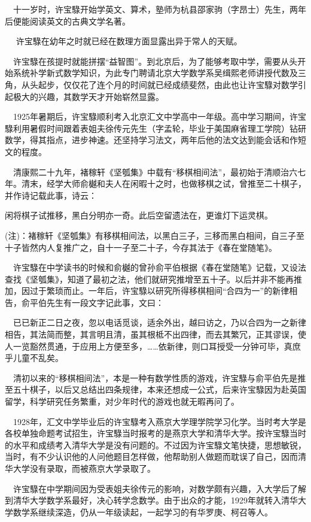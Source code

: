 \begin{frame}
	$\quad$十一岁时，许宝騄开始学英文、算术，塾师为杭县邵家驹（字昂士）先生，两年后便能阅读英文的古典文学名著。
	
	$\quad$	许宝騄在幼年之时就已经在数理方面显露出异于常人的天赋。
	
	$\quad$许宝騄在孩提时就能拼摆“益智图”。到北京后，为了能够考取中学，需要从头开始系统补学新式数学知识，为此专门聘请北京大学数学系吴缉熙老师讲授代数及三角，从头起步，仅仅花了连个月的时间就已经成绩斐然，由此也让许宝騄对数学引起极大的兴趣，其数学天才开始崭然显露。
	
	$\quad$1925年暑期后，许宝騄顺利考入北京汇文中学高中一年级。高中学习期间，许宝騄利用暑假时间跟着表姐夫徐传元先生（字孟轮，毕业于美国麻省理工学院）钻研数学，得其指点，进步神速。还坚持学习法文，两年后他的法文达到能会话和作短文的程度。
	
\end{frame}

\begin{frame}
	$\quad$清康熙二十九年，褚稼轩《坚瓠集》中载有“移棋相间法”，最初始于清顺治六七年。清末，经学大师俞樾和夫人在闲暇十之时，也做移棋之试，曾推至二十棋子，并作诗记载此事，诗云：
	
	闲将棋子试推移，黑白分明亦一奇。此后空留遗法在，更谁灯下运灵棋。
	
	(注)：褚稼轩《坚瓠集》有移棋相间法，以黑白三子，三移而黑白相间，自三子至十子皆然内人复推广之，自十一子至二十子，今存其法于《春在堂随笔》。
	
	$\quad$许宝騄在中学读书的时候和俞樾的曾孙俞平伯根据《春在堂随笔》记载，又设法查找《坚瓠集》，知道了最初之法，他们就研究推增至五十子。以后并非不能再推加，因过于繁琐而止。一年后，许宝騄以研究所得移棋相间“合四为一”的新律相告，俞平伯先生有一段文字记此事，文曰：
	
	$\quad$已已新正二日之夜，忽以电话觅谈，适余外出，越曰访之，乃以合四为一之新律相告，其法简而整，其言明且清，虽其根柢不出四律，而去其繁冗，正其谬误，使人一览豁然贯通，于应用上方便至多，……依新律，则口耳授受一分钟可毕，真庶乎儿童不乱矣。
	
\end{frame}

\begin{frame}
	$\quad$清初以来的“移棋相间法”，本是一种有数学性质的游戏，许宝騄与俞平伯先是推至五十棋子，以后又总结出四条规律，本来还想成一公式，后来许宝騄因为赴英国留学，科学研究任务繁重，对少年时代的游戏也就无暇再问了。
	
	$\quad$1928年，汇文中学毕业后的许宝騄考入燕京大学理学院学习化学。当时考大学是各校单独命题考试招生，许宝騄当时报考的是燕京大学和清华大学。按许宝騄当时的水平和成绩考入清华大学是没有问题的。不过因为许宝騄文笔快捷，思想敏锐，当时，有不少认识他的人问他题目怎样做，他帮助别人做题而耽误了自己，因而清华大学没有录取，而被燕京大学录取了。
	
	$\quad$许宝騄在中学期间因为受表姐夫徐传元的影响，对数学颇有兴趣，入大学后了解到清华大学数学系最好，决心转学念数学。由于出众的才能，1929年就转入清华大学数学系继续深造，仍从一年级读起，一起学习的有华罗庚、柯召等人。
	
\end{frame}

